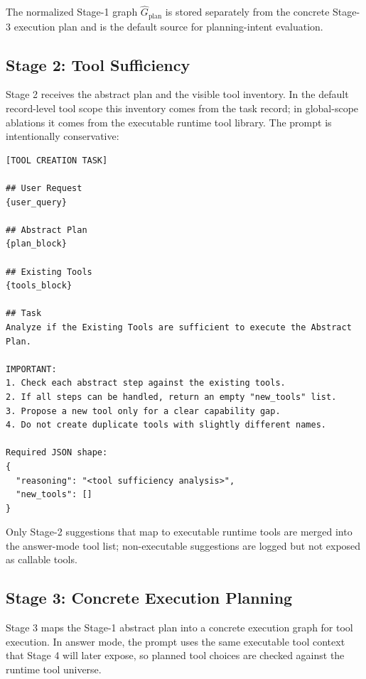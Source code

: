 \documentclass{article}
\begin{document}
The normalized Stage-1 graph $\widehat{G}_{\text{plan}}$ is stored separately
from the concrete Stage-3 execution plan and is the default source for
planning-intent evaluation.

\subsection{Stage 2: Tool Sufficiency}
\label{subsec:appendix-stage2}

Stage 2 receives the abstract plan and the visible tool inventory. In the
default record-level tool scope this inventory comes from the task record; in
global-scope ablations it comes from the executable runtime tool library. The
prompt is intentionally conservative:

\begin{lstlisting}
[TOOL CREATION TASK]

## User Request
{user_query}

## Abstract Plan
{plan_block}

## Existing Tools
{tools_block}

## Task
Analyze if the Existing Tools are sufficient to execute the Abstract Plan.

IMPORTANT:
1. Check each abstract step against the existing tools.
2. If all steps can be handled, return an empty "new_tools" list.
3. Propose a new tool only for a clear capability gap.
4. Do not create duplicate tools with slightly different names.

Required JSON shape:
{
  "reasoning": "<tool sufficiency analysis>",
  "new_tools": []
}
\end{lstlisting}

Only Stage-2 suggestions that map to executable runtime tools are merged into the
answer-mode tool list; non-executable suggestions are logged but not exposed as
callable tools.

\subsection{Stage 3: Concrete Execution Planning}
\label{subsec:appendix-stage3}

Stage 3 maps the Stage-1 abstract plan into a concrete execution graph for tool
execution. In answer mode, the prompt uses the same executable tool context that
Stage 4 will later expose, so planned tool choices are checked against the
runtime tool universe.
\end{document}
